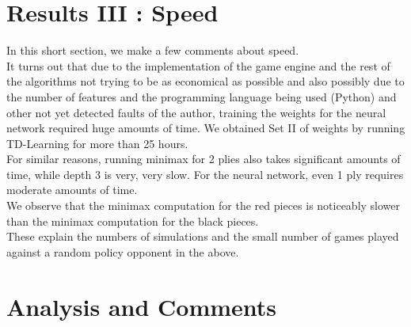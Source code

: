 \documentclass[11pt, a4paper, twoside]{amsart} %
\theoremstyle{definition}
\begin{document}
\section{Results III : Speed}

In this short section, we make a few comments about speed.\\
It turns out that due to the implementation of the game engine and the rest of the algorithms not trying to be as economical as possible and also possibly due to the number of features and the programming language being used (Python) and other not yet detected faults of the author, training the weights for the neural network required huge amounts of time. We obtained Set II of weights by running TD-Learning for more than 25 hours.\\
For similar reasons, running minimax for 2 plies also takes significant amounts of time, while depth 3 is very, very slow. For the neural network, even 1 ply requires moderate amounts of time.\\
We observe that the minimax computation for the red pieces is noticeably slower than the minimax computation for the black pieces.\\
These explain the numbers of simulations and the small number of games played against a random policy opponent in the above.

\section{Analysis and Comments}
\end{document}

